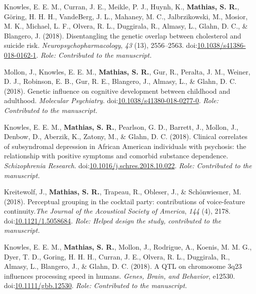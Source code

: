 \documentclass[10pt]{article}
\makeatletter
\newlength{\bibhang}
\newlength{\bibsep}
 {\@listi \global\bibsep\itemsep \global\advance\bibsep by\parsep}
\newenvironment{bibsection}%
        {\vspace{-\baselineskip}\begin{list}{}{%
       \setlength{\leftmargin}{\bibhang}%
       \setlength{\itemindent}{-\leftmargin}%
       \setlength{\itemsep}{\bibsep}%
       \setlength{\parsep}{\z@}%
        \setlength{\partopsep}{0pt}%
        \setlength{\topsep}{0pt}}}
        {\end{list}\vspace{-.6\baselineskip}}
\newcommand\doilink[1]{\href{http://dx.doi.org/#1}{#1}}
\newcommand\doi[1]{doi:\doilink{#1}}
\makeatother
\begin{document}
\begin{bibsection}
\item Knowles, E. E. M., Curran, J. E., Meikle, P. J., Huynh, K.,  \textbf{Mathias, S. R.}, Göring, H. H. H., VandeBerg, J. L., Mahaney, M. C., Jalbrzikowski, M., Mosior, M. K., Michael, L. F., Olvera, R. L., Duggirala, R., Almasy, L., Glahn, D. C., \& Blangero, J. (2018). Disentangling the genetic overlap between cholesterol and suicide risk. \emph{Neuropsychopharmacology}, \emph{43} (13), 2556--2563. \doi{10.1038/s41386-018-0162-1}. \emph{Role: Contributed to the manuscript.}

\item Mollon, J., Knowles, E. E. M.,  \textbf{Mathias, S. R.}, Gur, R., Peralta, J. M., Weiner, D. J., Robinson, E. B., Gur, R. E., Blangero, J., Almasy, L., \& Glahn, D. C. (2018). Genetic influence on cognitive development between childhood and adulthood. \emph{Molecular Psychiatry}. \doi{10.1038/s41380-018-0277-0}. \emph{Role: Contributed to the manuscript.}

\item Knowles, E. E. M., \textbf{Mathias, S. R.}, Pearlson, G. D., Barrett, J., Mollon, J., Denbow, D., Aberzik, K., Zatony, M., \& Glahn, D. C. (2018). Clinical correlates of subsyndromal depression in African American individuals with psychosis: the relationship with positive symptoms and comorbid substance dependence. \emph{Schizophrenia Research}. \doi{10.1016/j.schres.2018.10.022}. \emph{Role: Contributed to the manuscript.}

\item Kreitewolf, J., \textbf{Mathias, S. R.}, Trapeau, R., Obleser, J., \& Schönwiesner, M. (2018). Perceptual grouping in the cocktail party: contributions of voice-feature continuity.\emph{The Journal of the Acoustical Society of America}, \emph{144} (4), 2178. \doi{10.1121/1.5058684}.  \emph{Role: Helped design the study, contributed to the manuscript.}

\item Knowles, E. E. M., \textbf{Mathias, S. R.}, Mollon, J., Rodrigue, A., Koenis, M. M. G., Dyer, T. D., Goring, H. H. H., Curran, J. E., Olvera, R. L., Duggirala, R., Almasy, L., Blangero, J., \& Glahn, D. C. (2018). A QTL on chromosome 3q23 influences processing speed in humans. \emph{Genes, Brain, and Behavior}, e12530. \doi{10.1111/gbb.12530}. \emph{Role: Contributed to the manuscript.}


\end{bibsection}
\end{document}
